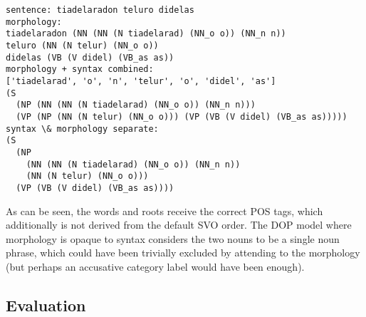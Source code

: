 \documentclass[10pt,a4paper]{article}
\begin{document}
\begin{verbatim}
sentence: tiadelaradon teluro didelas
morphology:
tiadelaradon (NN (NN (N tiadelarad) (NN_o o)) (NN_n n))
teluro (NN (N telur) (NN_o o))
didelas (VB (V didel) (VB_as as))
morphology + syntax combined:
['tiadelarad', 'o', 'n', 'telur', 'o', 'didel', 'as']
(S
  (NP (NN (NN (N tiadelarad) (NN_o o)) (NN_n n)))
  (VP (NP (NN (N telur) (NN_o o))) (VP (VB (V didel) (VB_as as)))))
syntax \& morphology separate:
(S
  (NP
    (NN (NN (N tiadelarad) (NN_o o)) (NN_n n))
    (NN (N telur) (NN_o o)))
  (VP (VB (V didel) (VB_as as))))
\end{verbatim}

As can be seen, the words and roots receive the correct POS tags, which
additionally is not derived from the default SVO order.
The DOP model where morphology is opaque to syntax considers the two nouns
to be a single noun phrase, which could have been trivially excluded by
attending to the morphology (but perhaps an accusative category label would
have been enough).

\begin{comment}
\subsection{Todo}

\item parse bitpar chart output into NLTK (currently only most probable derivation; 
  we need $n$ most probable parses and maybe shortest derivation, SL-DOP etc.)
\item use Reta Vortaro / ergane Esperanto dictionary and root lists 
  to induce segmentation / morphology model in a semi-supervised fashion.
\item check morphology coverage against vocabulary of Monato treebank
\item distinguish between morpheme and word boundaries (how?).
  possibly by having a trailing space as part of a morphological analysis 
  (but: this should not block inflection for plurality and accusative (+j and +n respectively).
\item finish report (convert wiki to latex?). evaluation \& conclusion.
  write about Dasgupta (2008) \& is there work on DOP + dependencies? 
  mention DLT as older exemplar model.
\item look at DOP* / U-DOP
\end{comment}


\subsection{Evaluation}
\end{document}
